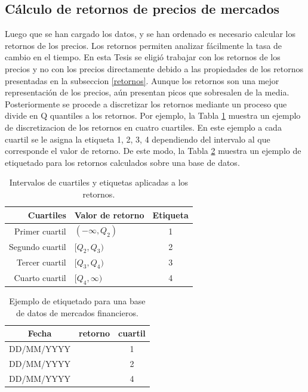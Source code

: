 \subsection{Cálculo de retornos de precios de mercados}
\label{sec_retornos}
Luego que se han cargado los datos, y se han ordenado es necesario calcular los retornos de los precios. 
Los retornos permiten analizar fácilmente la tasa de cambio en el tiempo.
En esta Tesis se eligió trabajar con los retornos de los precios y no con los precios directamente debido a las propiedades de los retornos presentadas en la subseccion \ref{retornos}.
Aunque los retornos son una mejor representación de los precios, aún presentan picos que sobresalen de la media. 
Posteriormente se procede a discretizar los retornos mediante un proceso que divide en Q quantiles a los retornos.
Por ejemplo, la Tabla \ref{quantile_example} muestra un ejemplo de discretizacion de los retornos en cuatro cuartiles. 
En este ejemplo a cada cuartil se le asigna la etiqueta 1, 2, 3, 4 dependiendo del intervalo al que corresponde el valor de retorno.
De este modo, la Tabla \ref{ejemplo_data-returns} muestra un ejemplo de etiquetado para los retornos calculados sobre una base de datos.

\begin{table}	
\begin{center}
	\begin{tabular}{ |r | l | c| }
		\hline
		Cuartiles &  Valor de retorno & Etiqueta  \\ \hline
		Primer cuartil & $(-\infty , Q_2)$ & 1 \\
		Segundo cuartil & $[Q_2 , Q_3)$   & 2\\ 
		Tercer cuartil &  $[Q_3 , Q_4)$   & 3 \\
		Cuarto cuartil & $[Q_4 , \infty)$ &4\\ 
		\hline
	\end{tabular}
	\label{quantile_example}
		\caption{Intervalos de cuartiles y etiquetas aplicadas a los retornos.}
\end{center}
\end{table}


\begin{table}
	\begin{center}
	\begin{tabular}{|c|c|c|}
		\hline 
		Fecha & retorno & cuartil \\ 
		\hline 
		DD/MM/YYYY & $$$$ & 1\\ 
		DD/MM/YYYY & $$$$ & 2\\ 
		DD/MM/YYYY & $$$$ & 4\\ 
		\hline 
	\end{tabular} 
	\label{ejemplo_data-returns}
	\caption{Ejemplo de etiquetado para una base de datos de mercados financieros.}
\end{center}
\end{table}

